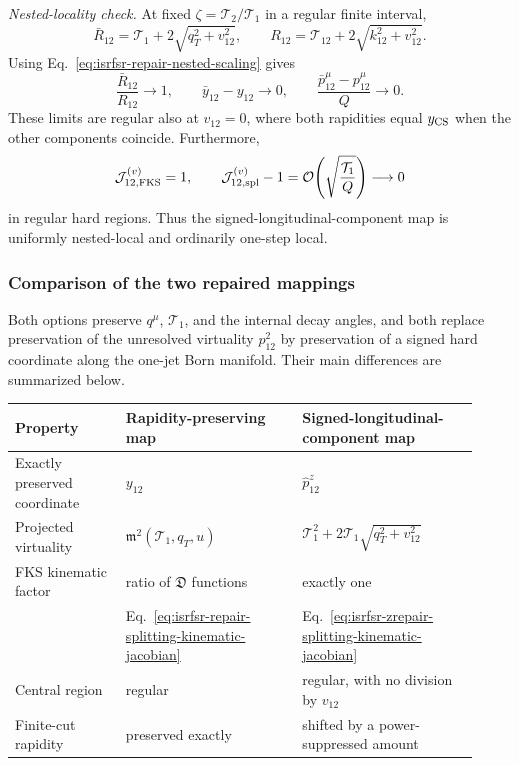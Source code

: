 \documentclass[11pt]{article}
\begin{document}
\medskip
\noindent
\textit{Nested-locality check.}
At fixed $\zeta=\mathcal T_2/\mathcal T_1$ in a regular finite interval,
\begin{equation}
\bar R_{12}
=
\mathcal T_1+2\sqrt{q_T^2+v_{12}^2},
\qquad
R_{12}
=
\mathcal T_{12}+2\sqrt{k_{12}^2+v_{12}^2}.
\label{eq:isrfsr-zrepair-R-components}
\end{equation}
Using Eq.~\eqref{eq:isrfsr-repair-nested-scaling} gives
\begin{equation}
\frac{\bar R_{12}}{R_{12}}\longrightarrow1,
\qquad
\bar y_{12}-y_{12}\longrightarrow0,
\qquad
\frac{\bar p_{12}^\mu-p_{12}^\mu}{Q}\longrightarrow0.
\label{eq:isrfsr-zrepair-locality-coordinates}
\end{equation}
These limits are regular also at $v_{12}=0$, where both rapidities equal $y_{\rm CS}$ when the other
components coincide.  Furthermore,
\begin{equation}
\mathcal J_{12,\rm FKS}^{(v)}=1,
\qquad
\mathcal J_{12,\rm spl}^{(v)}-1
=
\mathcal O\!\left(\sqrt{\frac{\mathcal T_1}{Q}}\right)
\longrightarrow0
\label{eq:isrfsr-zrepair-locality-jacobians}
\end{equation}
in regular hard regions.  Thus the signed-longitudinal-component map is uniformly nested-local and ordinarily
one-step local.

\subsubsection{Comparison of the two repaired mappings}
\label{subsubsec:z1j-isrfsr-repair-comparison}

Both options preserve $q^\mu$, $\mathcal T_1$, and the internal decay angles, and both replace preservation
of the unresolved virtuality $p_{12}^2$ by preservation of a signed hard coordinate along the one-jet Born
manifold.  Their main differences are summarized below.
\begin{center}
\small
\begin{tabular}{@{}p{0.22\linewidth}p{0.35\linewidth}p{0.35\linewidth}@{}}
\toprule
Property & Rapidity-preserving map & Signed-longitudinal-component map \\
\midrule
Exactly preserved coordinate
& $y_{12}$
& $\hat p_{12}^z$ \\
Projected virtuality
& $\mathfrak m^2(\mathcal T_1,q_T,u)$
& $\mathcal T_1^2+2\mathcal T_1\sqrt{q_T^2+v_{12}^2}$ \\
FKS kinematic factor
& ratio of $\mathfrak D$ functions
& exactly one \\

& Eq.~\eqref{eq:isrfsr-repair-splitting-kinematic-jacobian}
& Eq.~\eqref{eq:isrfsr-zrepair-splitting-kinematic-jacobian} \\
Central region
& regular
& regular, with no division by $v_{12}$ \\
Finite-cut rapidity
& preserved exactly
& shifted by a power-suppressed amount \\
\bottomrule
\end{tabular}
\end{center}
\end{document}
